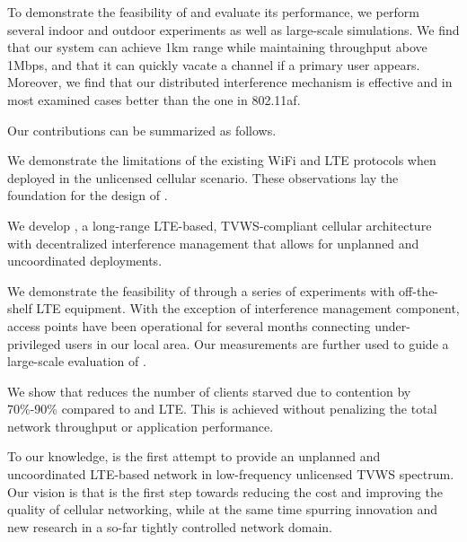 To demonstrate the feasibility of \cf and evaluate its performance, 
we perform several indoor and outdoor experiments as well as large-scale simulations. 
We find that our system can achieve 1km range while maintaining throughput above 1Mbps, and that it can quickly vacate a channel if a primary user appears. 
Moreover, we find that our distributed interference mechanism is effective and in most examined cases better than the one in 802.11af. 

Our contributions can be summarized as follows. 



\begin{sitemize}
\item We demonstrate the limitations
    of the existing WiFi and LTE protocols when deployed in the unlicensed
  cellular scenario. These observations lay the foundation for the  design of \cf.  
\item We develop \cf, a long-range LTE-based, TVWS-compliant cellular architecture with decentralized interference management that allows for unplanned and uncoordinated deployments. 
\item We demonstrate the feasibility of \cf through a series of experiments with off-the-shelf LTE equipment. 
With the exception of interference management component, \cf access points have been operational for several 
months connecting under-privileged users in our local area. Our measurements are further used to guide a large-scale evaluation of \cf. 
\item We show that \cf reduces the number of clients starved due to contention  by 70\%-90\% compared to \wf and LTE. This is achieved without penalizing the total network throughput or application performance.
\end{sitemize}

To our knowledge, \cf is the first attempt to provide an unplanned and uncoordinated LTE-based network in low-frequency unlicensed TVWS spectrum.
Our vision is that \cf is the first step towards reducing the cost and improving the quality of cellular networking, 
while at the same time spurring innovation and new research in a so-far tightly controlled network domain. 



